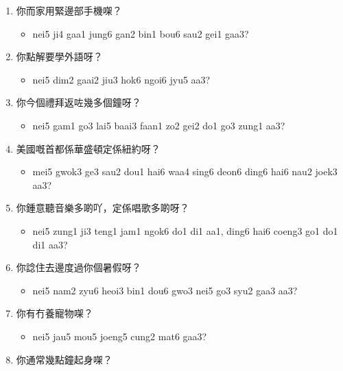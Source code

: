 \documentclass[12pt,a4paper]{leaflet}
\begin{document}
\begin{tcolorbox}[enhanced, breakable, skin first=enhanced, skin middle=enhanced, skin last=enhanced,colback=LightBlue!20!white, colframe=LightBlue!50!black, boxrule=0.5mm]
\begin{enumerate}[label={},leftmargin=0pt, itemindent=0pt]
\begin{itemize}[label={},leftmargin=0pt, itemindent=0pt]
\end{itemize}
\item \LARGE{你而家用緊邊部手機㗎？}
\begin{itemize}[label={},leftmargin=0pt, itemindent=0pt]
\item \footnotesize\textsf{nei5 ji4 gaa1 jung6 gan2 bin1 bou6 sau2 gei1 gaa3?}
\end{itemize}
\item \LARGE{你點解要學外語呀？}
\begin{itemize}[label={},leftmargin=0pt, itemindent=0pt]
\item \footnotesize\textsf{nei5 dim2 gaai2 jiu3 hok6 ngoi6 jyu5 aa3?}
\end{itemize}
\item \LARGE{你今個禮拜返咗幾多個鐘呀？}
\begin{itemize}[label={},leftmargin=0pt, itemindent=0pt]
\item \footnotesize\textsf{nei5 gam1 go3 lai5 baai3 faan1 zo2 gei2 do1 go3 zung1 aa3?}
\end{itemize}
\item \LARGE{美國嘅首都係華盛頓定係紐約呀？}
\begin{itemize}[label={},leftmargin=0pt, itemindent=0pt]
\item \footnotesize\textsf{mei5 gwok3 ge3 sau2 dou1 hai6 waa4 sing6 deon6 ding6 hai6 nau2 joek3 aa3?}
\end{itemize}
\item \LARGE{你鍾意聽音樂多啲吖，定係唱歌多啲呀？}
\begin{itemize}[label={},leftmargin=0pt, itemindent=0pt]
\item \footnotesize\textsf{nei5 zung1 ji3 teng1 jam1 ngok6 do1 di1 aa1, ding6 hai6 coeng3 go1 do1 di1 aa3?}
\end{itemize}
\item \LARGE{你諗住去邊度過你個暑假呀？}
\begin{itemize}[label={},leftmargin=0pt, itemindent=0pt]
\item \footnotesize\textsf{nei5 nam2 zyu6 heoi3 bin1 dou6 gwo3 nei5 go3 syu2 gaa3 aa3?}
\end{itemize}
\item \LARGE{你有冇養寵物㗎？}
\begin{itemize}[label={},leftmargin=0pt, itemindent=0pt]
\item \footnotesize\textsf{nei5 jau5 mou5 joeng5 cung2 mat6 gaa3?}
\end{itemize}
\item \LARGE{你通常幾點鐘起身㗎？}

\end{enumerate}
\end{tcolorbox}
\end{document}
